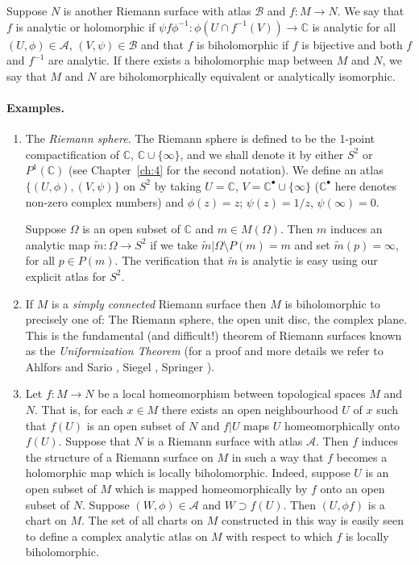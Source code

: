 Suppose $N$ is another Riemann surface with atlas $\mathcal B$ and $f:M\to N$. We say that $f$ is analytic or holomorphic if $\psi f\phi^{-1}:\phi(U\cap f^{-1}(V))\to\mathbb C$ is analytic for all $(U,\phi)\in\mathcal A$, $(V,\psi)\in\mathcal B$ and that $f$ is biholomorphic if $f$ is bijective and both $f$ and $f^{-1}$ are analytic. If there exists a biholomorphic map between $M$ and $N$, we say that $M$ and $N$ are biholomorphically equivalent or analytically isomorphic.

\paragraph*{Examples.}
\begin{enumerate}
\item The \emph{Riemann sphere}. The Riemann sphere is defined to be the 1-point compactification of $\mathbb C$, $\mathbb C\cup\{\infty\}$, and we shall denote it by either $S^2$ or $P^1(\mathbb C)$ (see Chapter~\ref{ch:4} for the second notation). We define an atlas $\{(U,\phi),(V,\psi)\}$ on $S^2$ by taking $U=\mathbb C$, $V=\mathbb C^\bullet\cup\{\infty\}$ ($\mathbb C^\bullet$ here denotes non-zero complex numbers) and $\phi(z)=z$; $\psi(z)=1/z$, $\psi(\infty)=0$.

Suppose $\Omega$ is an open subset of $\mathbb C$ and $m\in M(\Omega)$. Then $m$ induces an analytic map $\widetilde m:\Omega\to S^2$ if we take $\widetilde m|\Omega\setminus P(m)=m$ and set $\widetilde m(p)=\infty$, for all $p\in P(m)$. The verification that $\widetilde m$ is analytic is easy using our explicit atlas for $S^2$.

\item If $M$ is a \emph{simply connected} Riemann surface then $M$ is biholomorphic to precisely one of: The Riemann sphere, the open unit disc, the complex plane. This is the fundamental (and difficult!) theorem of Riemann surfaces known as the \emph{Uniformization Theorem} (for a proof and more details we refer to Ahlfors and Sario \cite{bib:I:ahlfors-l-v-and-sario-l:1}, Siegel \cite{bib:I:siegel-c-l:1}, Springer \cite{bib:I:springer-g:1}).

\item Let $f:M\to N$ be a local homeomorphism between topological spaces $M$ and $N$. That is, for each $x\in M$ there exists an open neighbourhood $U$ of $x$ such that $f(U)$ is an open subset of $N$ and $f|U$ maps $U$ homeomorphically onto $f(U)$. Suppose that $N$ is a Riemann surface with atlas $\mathcal A$. Then $f$ induces the structure of a Riemann surface on $M$ in such a way that $f$ becomes a holomorphic map which is locally biholomorphic. Indeed, suppose $U$ is an open subset of $M$ which is mapped homeomorphically by $f$ onto an
open subset of $N$. Suppose $(W,\phi)\in\mathcal A$ and $W\supset f(U)$. Then $(U,\phi f)$ is a chart on $M$. The set of all charts on $M$ constructed in this way is easily seen to define a complex analytic atlas on $M$ with respect to which $f$ is locally biholomorphic.


\end{enumerate}
